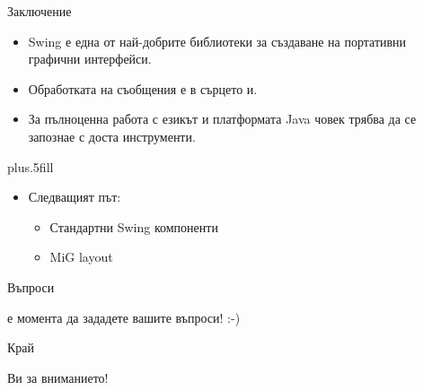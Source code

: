 \documentclass{beamer}
\begin{document}
\begin{frame}{Заключение}
  \transdissolve
  \begin{itemize}
  \item
    Swing е една от най-добрите библиотеки за създаване на портативни
    графични интерфейси.
  \item
    Обработката на съобщения е в сърцето и.
  \item
    За пълноценна работа с езикът и платформата Java човек трябва да
    се запознае с доста инструменти.
  \end{itemize}
  
  \vskip0pt plus.5fill
  \begin{itemize}
  \item
    Следващият път:
    \begin{itemize}
    \item
      Стандартни Swing компоненти
    \item
      MiG layout
    \end{itemize}
  \end{itemize}
\end{frame}

\begin{frame}{Въпроси}
  \transdissolve
  \begin{center}
     е момента да зададете вашите въпроси! :-)
  \end{center}
\end{frame}

\begin{frame}{Край}
  \transdissolve
  \begin{center}
     Ви за вниманието!
  \end{center}
\end{frame}
\end{document}
